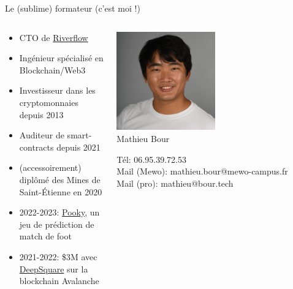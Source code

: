 \begin{frame}{Le (sublime) formateur (c'est moi !)}
  \begin{columns}
    \begin{column}{0.5\textwidth}
      \begin{itemize}
        \item CTO de \href{https://riverflow.co}{Riverflow}
        \item Ingénieur spécialisé en Blockchain/Web3
        \item Investisseur dans les cryptomonnaies depuis 2013
        \item Auditeur de smart-contracts depuis 2021
        \item (accessoirement) diplômé des Mines de Saint-Étienne en 2020
        \item 2022-2023: \href{https://pooky.gg}{Pooky}, un jeu de prédiction de match de foot
        \item 2021-2022: \$3M avec \href{https://deepsquare.io}{DeepSquare} sur la blockchain Avalanche
      \end{itemize}
    \end{column}

    \begin{column}{0.5\textwidth}
      \begin{center}
        \includegraphics[width=0.5\textwidth]{img/mathieu.jpg} \\
        Mathieu Bour

        Tél: 06.95.39.72.53 \\
        Mail (Mewo): mathieu.bour@mewo-campus.fr \\
        Mail (pro): mathieu@bour.tech
      \end{center}
    \end{column}
  \end{columns}
\end{frame}